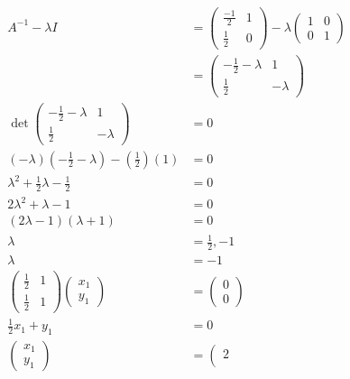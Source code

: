 \documentclass[main.tex]{subfiles}
\begin{document}
\begin{enumerate}
    $$
    \begin{aligned}
    A^{-1}-\lambda I &= \left(\begin{array}{cc}
    \frac{-1}{2} & 1 \\
    \frac{1}{2} & 0
    \end{array}\right)-\lambda\left(\begin{array}{ll}
    1 & 0 \\
    0 & 1
    \end{array}\right)\\
    &=\left(\begin{array}{cc}
    -\frac{1}{2}-\lambda & 1 \\
    \frac{1}{2} & -\lambda
    \end{array}\right)\\
    \operatorname{det}\left(\begin{array}{cc}
    -\frac{1}{2}-\lambda & 1 \\
    \frac{1}{2} & -\lambda
    \end{array}\right)&=0 \\
    (-\lambda)\left(-\frac{1}{2}-\lambda\right)-\left(\frac{1}{2}\right)(1)&=0 \\
    \lambda^{2}+\frac{1}{2} \lambda-\frac{1}{2}&=0 \\
    2 \lambda^{2}+\lambda-1&=0 \\
    (2 \lambda-1)(\lambda+1)&=0 \\
    \lambda&=\frac{1}{2},-1\\
    \lambda &= -1 \\
    \left(\begin{array}{cc}
    \frac{1}{2} & 1 \\
    \frac{1}{2} & 1
    \end{array}\right)\left(\begin{array}{l}
    x_{1} \\
    y_{1}
    \end{array}\right) &=\left(\begin{array}{l}
    0 \\
    0
    \end{array}\right) \\
    \frac{1}{2} x_{1}+y_{1} &=0 \\
    \left(\begin{array}{l}
    x_{1} \\
    y_{1}
    \end{array}\right) &=\left(\begin{array}{l}
    2 \\

\end{array}
\end{aligned}$$
\end{enumerate}
\end{document}
